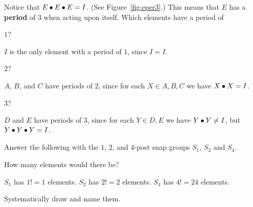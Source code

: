 \documentclass[../gatm_answers.tex]{subfiles}
\begin{document}
\begin{outer_problem}
	\item Notice that $E\bullet E\bullet E=I$. (See Figure~\ref{fig:eper3}.)
	      This means that $E$ has a \textbf{period} of $3$ when acting upon itself.
	      Which elements have a period of
\end{outer_problem}

\begin{inner_problem}[start=1]
	 \item $1$?
\end{inner_problem}

\noindent $I$ is the only element with a period of $1$, since $I=I$.

\begin{inner_problem}
	 \item $2$?
\end{inner_problem}

\noindent $A$, $B$, and $C$ have periods of $2$, since for each $X\in{A,B,C}$ we have $X\bullet X = I$.

\begin{inner_problem}
	 \item $3$?
\end{inner_problem}

\noindent $D$ and $E$ have periods of $3$, since for each $Y\in {D,E}$ we have $Y\bullet Y\neq I$, but $Y\bullet Y\bullet Y=I$.

\begin{outer_problem}
	\item Answer the following with the $1$, $2$, and $4$-post snap groups $S_1$, $S_2$ and $S_4$.
\end{outer_problem}

\begin{inner_problem}[start=1]
	\item How many elements would there be?
\end{inner_problem}

\noindent $S_1$ has $1!=1$ elements. $S_2$ has $2!=2$ elements. $S_4$ has $4!=24$ elements.

\begin{inner_problem}
	\item Systematically draw and name them.
\end{inner_problem}
\end{document}
